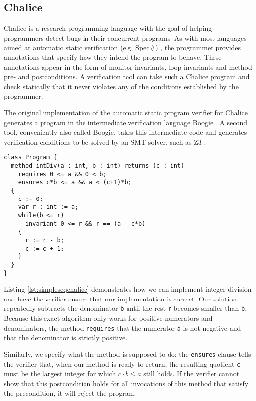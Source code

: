 
\subsection{Chalice}\label{sct:chalice}
Chalice \cite{LMS09,LM09} is a research programming language with the goal of helping programmers detect bugs in their concurrent programs. 
As with most languages aimed at automatic static verification (e.g, Spec\#) \cite{BLS04}, the programmer provides annotations that specify how they intend the program to behave.
These annotations appear in the form of monitor invariants, loop invariants and method pre- and postconditions.
A verification tool can take such a Chalice program and check statically that it never violates any of the conditions established by the programmer.

The original implementation of the automatic static program verifier for Chalice generates a program in the intermediate verification language Boogie \cite{ByECD+06}.
A second tool, conveniently also called Boogie, takes this intermediate code and generates verification conditions to be solved by an SMT solver, such as Z3 \cite{dMB08}.

\begin{lstlisting}[language=Chalice,float,caption={Loop invariants, pre- and post conditions in a Chalice program},label=lst:simpleseqchalice]
class Program {
  method intDiv(a : int, b : int) returns (c : int)
    requires 0 <= a && 0 < b;
    ensures c*b <= a && a < (c+1)*b;
  {
    c := 0;
    var r : int := a;
    while(b <= r)
      invariant 0 <= r && r == (a - c*b)
    {
      r := r - b;
      c := c + 1;
    }
  }
}
\end{lstlisting}

Listing \ref{lst:simpleseqchalice} demonstrates how we can implement integer division and have the verifier ensure that our implementation is correct.
Our solution repeatedly subtracts the denominator \lstinline!b! until the rest \lstinline!r! becomes smaller than \lstinline!b!. 
Because this exact algorithm only works for positive numerators and denominators, the method \lstinline[language=chalice]!requires! that the numerator \lstinline!a! is not negative and that the denominator is strictly positive.

Similarly, we specify what the method is supposed to do: the \lstinline[language=Chalice]!ensures! clause tells the verifier that, when our method is ready to return, the resulting quotient \lstinline!c! must be the largest integer for which $c \cdot b \leq a$ still holds.
If the verifier cannot show that this postcondition holds for all invocations of this method that satisfy the precondition, it will reject the program.

